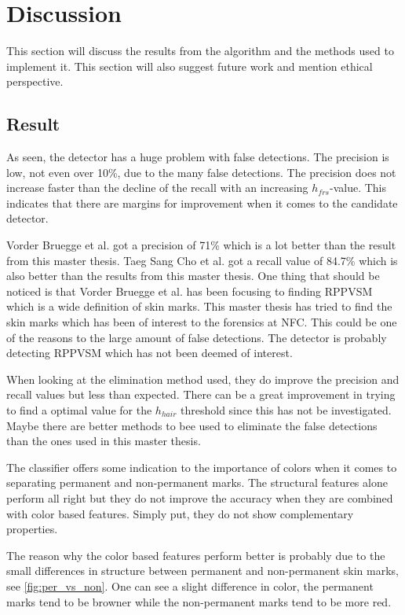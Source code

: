 \chapter{Discussion}\label{cha:Discussion}

This section will discuss the results from the algorithm and the methods used to implement it. This section will also suggest future work and mention ethical perspective.  

\section{Result}

As seen, the detector has a huge problem with false detections. The precision is low, not even over 10\%, due to the many false detections. The precision does not increase faster than the decline of the recall with an increasing $h_{frs}$-value. This indicates that there are margins for improvement when it comes to the candidate detector.

Vorder Bruegge et al. \cite{automatic_detector_2015} got a precision of 71\% which is a lot better than the result from this master thesis. Taeg Sang Cho et al.\cite{reliable_mole} got a recall value of 84.7\% which is also better than the results from this master thesis. One thing that should be noticed is that Vorder Bruegge et al. has been focusing to finding RPPVSM which is a wide definition of skin marks. This master thesis has tried to find the skin marks which has been of interest to the forensics at NFC. This could be one of the reasons to the large amount of false detections. The detector is probably detecting RPPVSM which has not been deemed of interest.     

When looking at the elimination method used, they do improve the precision and recall values but less than expected. There can be a great improvement in trying to find a optimal value for the $h_{hair}$ threshold since this has not be investigated. Maybe there are better methods to bee used to eliminate the false detections than the ones used in this master thesis.  

The classifier offers some indication to the importance of colors when it comes to separating permanent and non-permanent marks. The structural features alone perform all right but they do not improve the accuracy when they are combined with color based features. Simply put, they do not show complementary properties. 

The reason why the color based features perform better is probably due to the small differences in structure between permanent and non-permanent skin marks, see \cref{fig:per_vs_non}. One can see a slight difference in color, the permanent marks tend to be browner while the non-permanent marks tend to be more red.  


